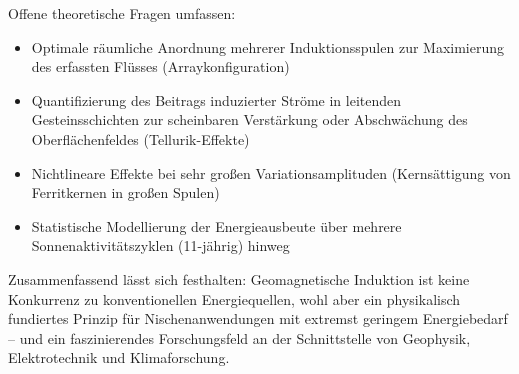 ﻿\documentclass[a4paper,12pt]{article}
\theoremstyle{definition}
\begin{document}
Offene theoretische Fragen umfassen:
\begin{itemize}
    \item Optimale r\"aumliche Anordnung mehrerer Induktionsspulen
          zur Maximierung des erfassten Fl\"usses (Arraykonfiguration)
    \item Quantifizierung des Beitrags induzierter Str\"ome in leitenden
          Gesteinsschichten zur scheinbaren Verst\"arkung oder Abschwächung
          des Oberfl\"achenfeldes (Tellurik-Effekte)
    \item Nichtlineare Effekte bei sehr gro{\ss}en Variationsamplituden
          (Kernsättigung von Ferritkernen in gro{\ss}en Spulen)
    \item Statistische Modellierung der Energieausbeute \"uber mehrere
          Sonnenaktivit\"atszyklen (11-j\"ahrig) hinweg
\end{itemize}

Zusammenfassend l\"asst sich festhalten: Geomagnetische Induktion
ist keine Konkurrenz zu konventionellen Energiequellen, wohl aber
ein physikalisch fundiertes Prinzip f\"ur Nischenanwendungen mit
extremst geringem Energiebedarf -- und ein faszinierendes Forschungsfeld
an der Schnittstelle von Geophysik, Elektrotechnik und Klimaforschung.
\end{document}
